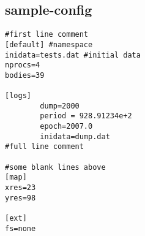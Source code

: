 \hypertarget{sample-config-example}{
\subsection{sample-config}
}


\begin{DocInclude}\begin{verbatim}#first line comment
[default] #namespace
inidata=tests.dat #initial data
nprocs=4
bodies=39

[logs]
        dump=2000
        period = 928.91234e+2
        epoch=2007.0
        inidata=dump.dat
#full line comment

#some blank lines above
[map]
xres=23
yres=98

[ext]
fs=none
\end{verbatim}
\end{DocInclude}
 